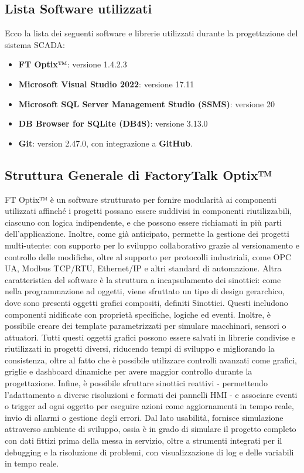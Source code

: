 \subsection{Lista Software utilizzati}
Ecco la lista dei seguenti software e librerie utilizzati durante la progettazione del sistema SCADA:
\begin{itemize}
    \item \textbf{FT Optix™}: versione 1.4.2.3
    \item \textbf{Microsoft Visual Studio 2022}: versione 17.11
    \item \textbf{Microsoft SQL Server Management Studio (SSMS)}: versione 20
    \item \textbf{DB Browser for SQLite (DB4S)}: versione 3.13.0
    \item \textbf{Git}: version 2.47.0, con integrazione a \textbf{GitHub}.
\end{itemize}

\subsection{Struttura Generale di FactoryTalk Optix™}
FT Optix™ è un software strutturato per fornire modularità ai componenti utilizzati affinché i progetti possano essere suddivisi in componenti riutilizzabili, ciascuno con logica indipendente, e che possono essere richiamati in più parti dell'applicazione. Inoltre, come già anticipato, permette la gestione dei progetti multi-utente: con supporto per lo sviluppo collaborativo grazie al versionamento e controllo delle modifiche, oltre al supporto per protocolli industriali, come OPC UA, Modbus TCP/RTU, Ethernet/IP e altri standard di automazione. Altra caratteristica del software è la struttura a incapsulamento dei sinottici: come nella programmazione ad oggetti, viene sfruttato un tipo di design gerarchico, dove sono presenti oggetti grafici compositi, definiti Sinottici. Questi includono componenti nidificate con proprietà specifiche, logiche ed eventi. Inoltre, è possibile creare dei template parametrizzati per simulare macchinari, sensori o attuatori. Tutti questi oggetti grafici possono essere salvati in librerie condivise e riutilizzati in progetti diversi, riducendo tempi di sviluppo e migliorando la consistenza, oltre al fatto che è possibile utilizzare controlli avanzati come grafici, griglie e dashboard dinamiche per avere maggior controllo durante la progettazione. Infine, è possibile sfruttare sinottici reattivi - permettendo l'adattamento a diverse risoluzioni e formati dei pannelli HMI - e associare eventi o trigger ad ogni oggetto per eseguire azioni come aggiornamenti in tempo reale, invio di allarmi o gestione degli errori. Dal lato usabilità, fornisce simulazione attraverso ambiente di sviluppo, ossia è in grado di simulare il progetto completo con dati fittizi prima della messa in servizio, oltre a strumenti integrati per il debugging e la risoluzione di problemi, con visualizzazione di log e delle variabili in tempo reale.

